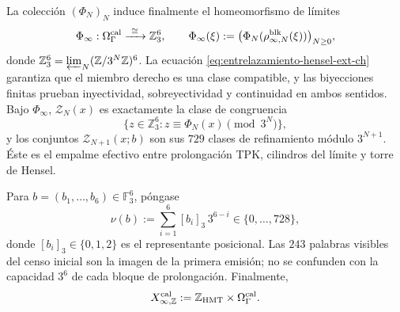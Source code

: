 La colección \((\Phi_N)_N\) induce finalmente el homeomorfismo de límites
\begin{equation}
 \Phi_\infty:\Omega_\Gamma^{\rm cal}
 \xrightarrow{\ \cong\ }\mathbb Z_3^6,\qquad
 \Phi_\infty(\xi):=
 \bigl(\Phi_N(\rho^{\rm blk}_{\infty,N}(\xi))\bigr)_{N\ge0},
 \label{eq:phi-infinito-hensel-ext-ch}
\end{equation}
donde
\(\mathbb Z_3^6=\varprojlim_N(\mathbb Z/3^N\mathbb Z)^6\).
La ecuación \eqref{eq:entrelazamiento-hensel-ext-ch} garantiza que el miembro
derecho es una clase compatible, y las biyecciones finitas prueban
inyectividad, sobreyectividad y continuidad en ambos sentidos. Bajo
\(\Phi_\infty\), \(\mathscr Z_N(x)\) es exactamente la clase de congruencia
\[
 \{z\in\mathbb Z_3^6:z\equiv\Phi_N(x)\pmod{3^N}\},
\]
y los conjuntos \(\mathscr Z_{N+1}(x;b)\) son sus \(729\) clases de refinamiento
módulo \(3^{N+1}\). Éste es el empalme efectivo entre prolongación TPK,
cilindros del límite y torre de Hensel.

Para \(b=(b_1,\ldots,b_6)\in\mathbb F_3^6\), póngase
\[
 \nu(b):=\sum_{i=1}^{6}[b_i]_3\,3^{6-i}
 \in\{0,\ldots,728\},
\tag{C.40c$_0$}
\label{eq:valor-bloque-ch}
\]
donde \([b_i]_3\in\{0,1,2\}\) es el representante posicional. Las
\(243\) palabras visibles del censo inicial son la imagen de la primera
emisión; no se confunden con la capacidad \(3^6\) de cada bloque de
prolongación. Finalmente,
\[
 X_{\infty,\mathbb Z}^{\rm cal}
 :=\mathbb Z_{\rm HMT}\times\Omega_\Gamma^{\rm cal}.
\]
